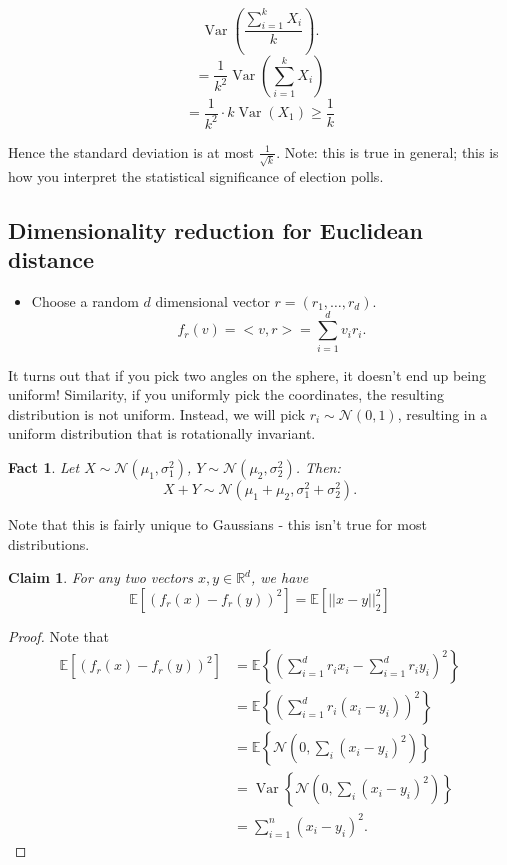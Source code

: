 \documentclass[12pt]{article}
\newtheorem*{claim}{Claim}
\newtheorem*{fact}{Fact}
\newcommand{\RR}{\mathbb{R}}
\newcommand{\EE}{\mathbb{E}}
\newcommand{\NN}{\mathcal{N}}
\DeclareMathOperator{\Var}{Var}
\begin{document}
\[
  \Var \left( \frac{\sum_{i=1}^{k} X_i}{k} \right).
\]
\[
  = \frac{1}{k^2} \Var \left( \sum_{i=1}^{k} X_i \right)
\]
\[
  = \frac{1}{k^2} \cdot k \Var(X_1) \geq \frac{1}{k}
\]

Hence the standard deviation is at most $\frac{1}{\sqrt{k}}$.  Note: this is true in general; this is how you interpret the statistical significance of election polls.

\subsection{Dimensionality reduction for Euclidean distance}

\begin{itemize}
  \item Choose a random $d$ dimensional vector $r = (r_1, \dots, r_d)$.
    \[
      f_r(v) = <v, r> = \sum_{i=1}^{d} v_i r_i.
    \]
\end{itemize}

It turns out that if you pick two angles on the sphere, it doesn't end up being uniform!  Similarity, if you uniformly pick the coordinates, the resulting distribution is not uniform.  Instead, we will pick $r_i \sim \NN(0, 1)$, resulting in a uniform distribution that is rotationally invariant. \\

\begin{fact}
  Let $X \sim \NN(\mu_1, \sigma_1^2)$, $Y \sim \NN(\mu_2, \sigma_2^2)$.  Then:
  \[
    X+Y \sim \NN(\mu_1 + \mu_2, \sigma_1^2 + \sigma_2^2).
  \]
\end{fact}

Note that this is fairly unique to Gaussians - this isn't true for most distributions.

\begin{claim}
  For any two vectors $x, y \in \RR^d$, we have
  \[
    \EE [ (f_r(x) - f_r(y))^2 ] = \EE [ ||x - y||_2^2 ]
  \]
\end{claim}

\begin{proof}
  Note that 
  \begin{align*}
    \EE [ (f_r(x) -  f_r(y))^2 ] &= \EE \left\{ \left( \sum_{i=1}^{d} r_i x_i - \sum_{i=1}^{d} r_i y_i \right)^2 \right\} \\
    &= \EE \left\{ \left( \sum_{i=1}^{d} r_i (x_i - y_i) \right)^2 \right\} \\
    &= \EE \left\{ \NN (0, \sum_i (x_i-y_i)^2) \right\} \\
    &= \Var \left\{ \NN (0, \sum_{i} (x_i - y_i)^2) \right\} \\
    &= \sum_{i=1}^{n} (x_i - y_i)^2.
  \end{align*}
\end{proof}
\end{document}
